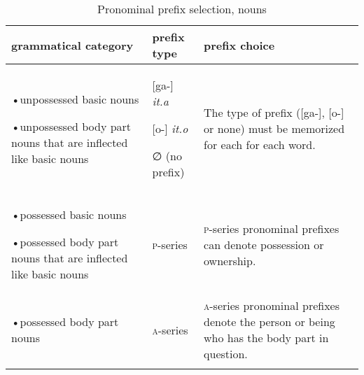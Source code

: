 

\begin{table}
\caption{Pronominal prefix selection, nouns}
\label{tab:1:pronselnouns}
\scriptsize{
\begin{tabularx}{\textwidth}{XXX}

\lsptoprule
grammatical category & prefix type & prefix choice\\
\midrule
{}•unpossessed basic nouns

{}•unpossessed body part nouns that are inflected like basic nouns

& [ga-] \textit{it.a}

[o-] \textit{it.o}

∅ (no prefix)

& The type of prefix ([ga-], [o-] or none) must be memorized for each for each word.\\


{}•possessed basic nouns 

{}•possessed body part nouns that are inflected like basic nouns

& 

\textsc{p}-series & \textsc{p}-series pronominal prefixes can denote possession or ownership.\\
{}•possessed body part nouns & \textsc{a}-series & \textsc{a}-series pronominal prefixes denote the person or being who has the body part in question. \\
\lspbottomrule
\end{tabularx}}
\end{table}


